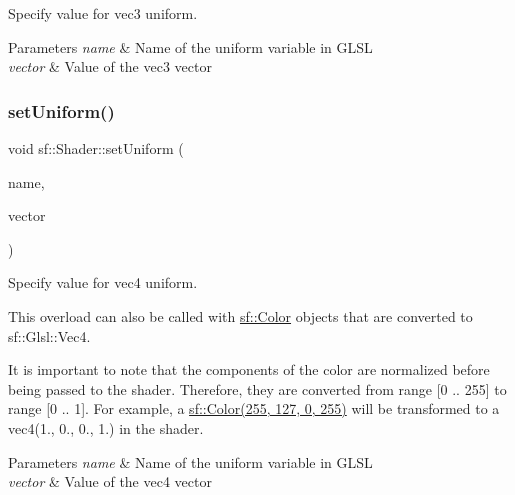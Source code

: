 Specify value for {\ttfamily vec3} uniform. 


\begin{DoxyParams}{Parameters}
{\em name} & Name of the uniform variable in G\+L\+SL \\
\hline
{\em vector} & Value of the vec3 vector \\
\hline
\end{DoxyParams}
\mbox{\label{classsf_1_1_shader_abc1aee8343800680fd62e1f3d43c24bf}} 
\subsubsection{\texorpdfstring{set\+Uniform()}{setUniform()}\hspace{0.1cm}{\footnotesize\ttfamily [4/16]}}
{\footnotesize\ttfamily void sf\+::\+Shader\+::set\+Uniform (\begin{DoxyParamCaption}\item[{const std\+::string \&}]{name,  }\item[{const \hyperlink{structsf_1_1priv_1_1_vector4}{Glsl\+::\+Vec4} \&}]{vector }\end{DoxyParamCaption})}



Specify value for {\ttfamily vec4} uniform. 

This overload can also be called with \hyperlink{classsf_1_1_color}{sf\+::\+Color} objects that are converted to sf\+::\+Glsl\+::\+Vec4.

It is important to note that the components of the color are normalized before being passed to the shader. Therefore, they are converted from range \mbox{[}0 .. 255\mbox{]} to range \mbox{[}0 .. 1\mbox{]}. For example, a \hyperlink{classsf_1_1_color}{sf\+::\+Color(255, 127, 0, 255)} will be transformed to a vec4(1., 0., 0., 1.) in the shader.


\begin{DoxyParams}{Parameters}
{\em name} & Name of the uniform variable in G\+L\+SL \\
\hline
{\em vector} & Value of the vec4 vector \\
\hline
\end{DoxyParams}
\mbox{\label{classsf_1_1_shader_ae4fc8b4c18e6b653952bce5c8c81e4a0}} 
